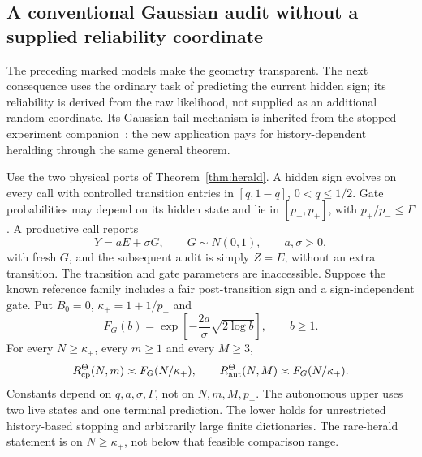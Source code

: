 \subsection*{A conventional Gaussian audit without a supplied reliability coordinate}
The preceding marked models make the geometry transparent. The next consequence uses the ordinary task of predicting the current hidden sign; its reliability is derived from the raw likelihood, not supplied as an additional random coordinate. Its Gaussian tail mechanism is inherited from the stopped-experiment companion~\cite{GTF52}; the new application pays for history-dependent heralding through the same general theorem.

\begin{theorem}\label{thm:gaussian-herald}
Use the two physical ports of Theorem~\ref{thm:herald}. A hidden sign evolves on every call with controlled transition entries in $[q,1-q]$, $0<q\le1/2$. Gate probabilities may depend on its hidden state and lie in $[p_-,p_+]$, with $p_+/p_-\le\Gamma$. A productive call reports
\[
 Y=aE+\sigma G,\qquad G\sim N(0,1),\qquad a,\sigma>0,
\]
with fresh $G$, and the subsequent audit is simply $Z=E$, without an extra transition. The transition and gate parameters are inaccessible. Suppose the known reference family includes a fair post-transition sign and a sign-independent gate. Put $B_0=0$, $\kappa_+=1+1/p_-$ and
\[
 F_G(b)=\exp\!\left[-\frac{2a}{\sigma}\sqrt{2\log b}\right],\qquad b\ge1.
\]
For every $N\ge\kappa_+$, every $m\ge1$ and every $M\ge3$,
\[
 R_{\mathrm{cp}}^\Theta(N,m)\asymp F_G(N/\kappa_+),\qquad
 R_{\mathrm{aut}}^\Theta(N,M)\asymp F_G(N/\kappa_+).
\]
Constants depend on $q,a,\sigma,\Gamma$, not on $N,m,M,p_-$. The autonomous upper uses two live states and one terminal prediction. The lower holds for unrestricted history-based stopping and arbitrarily large finite dictionaries. The rare-herald statement is on $N\ge\kappa_+$, not below that feasible comparison range.
\end{theorem}
